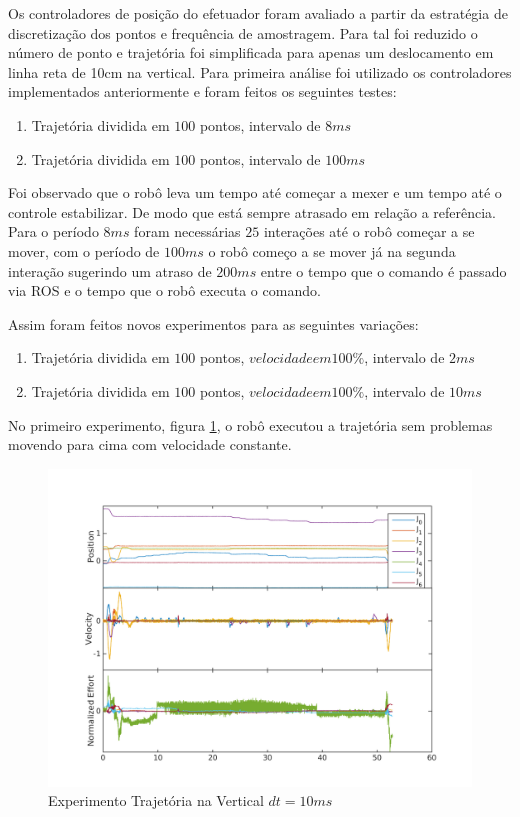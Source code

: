 
Os controladores de posição do efetuador foram avaliado a partir da estratégia de discretização dos pontos e frequência de amostragem. Para tal foi reduzido o número de ponto e trajetória foi simplificada para apenas um deslocamento em linha reta de 10cm na vertical. Para primeira análise foi utilizado os controladores implementados anteriormente e foram feitos os seguintes testes:

\begin{enumerate}
    \item Trajetória dividida em $100$ pontos, intervalo de $8 ms$
    \item Trajetória dividida em $100$ pontos, intervalo de $100 ms$
\end{enumerate}

Foi observado que o robô leva um tempo até começar a mexer e um tempo até o controle estabilizar. De modo que está sempre atrasado em relação a referência. Para o período $8 ms$ foram necessárias $25$ interações até o robô começar a se mover, com o período de $100 ms$ o robô começo a se mover já na segunda interação sugerindo um atraso de $200 ms$ entre o tempo que o comando é passado via ROS e o tempo que o robô executa o comando.


Assim foram feitos novos experimentos para as seguintes variações:

\begin{enumerate}
    \item Trajetória dividida em $100$ pontos, $velocidade em 100\%$, intervalo de $2 ms$
    \item Trajetória dividida em $100$ pontos, $velocidade em 100\%$, intervalo de $10 ms$
\end{enumerate}

No primeiro experimento, figura \ref{fig:moveUp1}, o robô executou a trajetória sem problemas movendo para cima com velocidade constante.

\begin{figure}[H]
    \centering
    \includegraphics[width=0.6\linewidth,trim={2cm 1cm 2cm 2cm}]{tex/figs/moveUp1stateEvalv70s10.png}
    \caption{Experimento Trajetória na Vertical $dt=10ms$ }
    \label{fig:moveUp1}
\end{figure}

